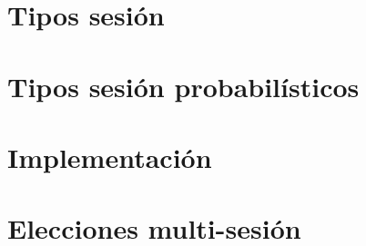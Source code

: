 \documentclass[11pt,a4paper]{tesis}
\begin{document}

\def\autor{Iván Pondal}
\def\tituloTesis{Inferencia de tipos sesión probabilísticos}
\def\runtitulo{Inferencia de tipos sesión probabilísticos}
\def\director{Hernán Melgratti}
\def\lugar{Buenos Aires, 2021}



\frontmatter
\pagestyle{empty}


\cleardoublepage


\cleardoublepage


\cleardoublepage
\tableofcontents

\listoftodos

\mainmatter
\pagestyle{headings}


\chapter{Tipos sesión}





\chapter{Tipos sesión probabilísticos}





\chapter{Implementación}



\chapter{Elecciones multi-sesión}




\backmatter


\end{document}
